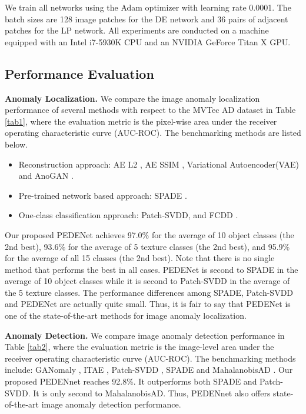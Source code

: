 \documentclass{article}
\begin{document}
We train all networks using the Adam optimizer with learning rate
0.0001. The batch sizes are 128 image patches for the DE network and 36
pairs of adjacent patches for the LP network. All experiments are
conducted on a machine equipped with an Intel i7-5930K CPU and an NVIDIA
GeForce Titan X GPU. 



\subsection{Performance Evaluation}\label{subsec:performance}

\textbf{Anomaly Localization.} We compare the image anomaly localization
performance of several methods with respect to the MVTec AD dataset
\cite{bergmann2019mvtec} in Table \ref{tab1}, where the evaluation
metric is the pixel-wise area under the receiver operating
characteristic curve (AUC-ROC). The benchmarking methods are listed
below. 
\begin{itemize}
\item Reconstruction approach: AE L2 \cite{bergmann2019mvtec}, AE SSIM
\cite{DBLP:conf/visapp/BergmannLFSS19}, Variational Autoencoder(VAE) and AnoGAN \cite{schlegl2017unsupervised}. 
\item Pre-trained network based approach: SPADE \cite{cohen2020sub}. 
\item One-class classification approach: Patch-SVDD\cite{yi2020patch}, and
FCDD \cite{liznerski2020explainable}. 
\end{itemize}
Our proposed PEDENet achieves 97.0\% for the average of 10 object classes
(the 2nd best), 93.6\% for the average of 5 texture classes (the 2nd
best), and 95.9\% for the average of all 15 classes (the 2nd best).
Note that there is no single method that performs the best in all cases.
PEDENet is second to SPADE in the average of 10 object classes while it
is second to Patch-SVDD in the average of the 5 texture classes. The
performance differences among SPADE, Patch-SVDD and PEDENet are actually
quite small. Thus, it is fair to say that PEDENet is one of the
state-of-the-art methods for image anomaly localization. 

\textbf{Anomaly Detection.} We compare image anomaly detection
performance in Table \ref{tab2}, where the evaluation metric is the
image-level area under the receiver operating characteristic curve
(AUC-ROC).  The benchmarking methods include: GANomaly
\cite{akcay2018ganomaly}, ITAE \cite{fei2020attribute}, Patch-SVDD
\cite{yi2020patch}, SPADE \cite{cohen2020sub} and MahalanobisAD
\cite{rippel2020modeling}.  Our proposed PEDENnet reaches 92.8\%. It
outperforms both SPADE and Patch-SVDD.  It is only second to
MahalanobisAD. Thus, PEDENnet also offers state-of-the-art image anomaly
detection performance. 
\end{document}
